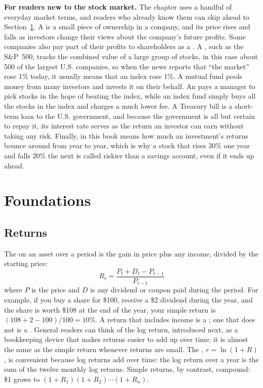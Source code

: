 \begin{callout}
\textbf{For readers new to the stock market.} The chapter uses a handful of everyday market terms, and readers who already know them can skip ahead to Section~\ref{sec:01-foundations}. A  is a small piece of ownership in a company, and its price rises and falls as investors change their views about the company's future profits. Some companies also pay part of their profits to shareholders as a . A , such as the S\&P~500, tracks the combined value of a large group of stocks, in this case about 500 of the largest U.S. companies, so when the news reports that ``the market'' rose 1\% today, it usually means that an index rose 1\%. A mutual fund pools money from many investors and invests it on their behalf. An  pays a manager to pick stocks in the hope of beating the index, while an index fund simply buys all the stocks in the index and charges a much lower fee. A Treasury bill is a short-term loan to the U.S. government, and because the government is all but certain to repay it, its interest rate serves as the return an investor can earn without taking any risk. Finally,  in this book means how much an investment's returns bounce around from year to year, which is why a stock that rises 30\% one year and falls 20\% the next is called riskier than a savings account, even if it ends up ahead.
\end{callout}


\section{Foundations}
\label{sec:01-foundations}

\subsection{Returns}

The  on an asset over a period is the gain in price plus any income, divided by the starting price:
\begin{equation}
  R_t = \frac{P_t + D_t - P_{t-1}}{P_{t-1}}
  \label{eq:01-return}
\end{equation}
where $P$ is the price and $D$ is any dividend or coupon paid during the period. For example, if you buy a share for \$100, receive a \$2 dividend during the year, and the share is worth \$108 at the end of the year, your simple return is $(108 + 2 - 100)/100 = 10$\%. A return that includes income is a ; one that does not is a . General readers can think of the log return, introduced next, as a bookkeeping device that makes returns easier to add up over time; it is almost the same as the simple return whenever returns are small. The , $r = \ln(1 + R)$, is convenient because log returns add over time: the log return over a year is the sum of the twelve monthly log returns. Simple returns, by contrast, compound: \$1 grows to $(1 + R_1)(1 + R_2)\cdots(1 + R_n)$.

